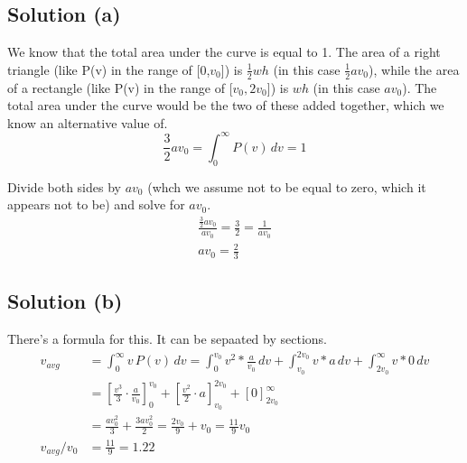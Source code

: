 \documentclass[12pt]{article}
\begin{document}
        \subsection{Solution (a)}
            We know that the total area under the curve is equal to 1.
            The area of a right triangle (like P(v) in the range of [0,$v_0$]) is $\frac{1}{2}wh$ (in this case $\frac{1}{2}av_0$), while the area of a rectangle (like P(v) in the range of [$v_0,2v_0$]) is $wh$ (in this case $av_0$).
            The total area under the curve would be the two of these added together, which we know an alternative value of.
            \begin{equation}
                \frac{3}{2}av_0 =   \int_{0}^{\infty} P(v)\,dv = 1
            \end{equation}

            Divide both sides by $av_0$ (whch we assume not to be equal to zero, which it appears not to be) and solve for $av_0$.
            \begin{gather}
                \frac{\frac{3}{2}av_0}{av_0}    =   \frac{3}{2} =   \frac{1}{av_0}\\
                \boxed{av_0    =   \frac{2}{3}}
            \end{gather}

        \subsection{Solution (b)}
            There's a formula for this.
            It can be sepaated by sections.
            \begin{align}
                v_{avg} &=  \int_{0}^{\infty} v\,P(v)\,dv
                    =   \int_{0}^{v_0} v^2 * \frac{a}{v_0}\,dv + \int_{v_0}^{2v_0} v * a \,dv + \int_{2v_0}^{\infty} v * 0\,dv\\
                    &=  \left[ \frac{v^3}{3} \cdot \frac{a}{v_0} \right]_{0}^{v_0}
                        +   \left[ \frac{v^2}{2} \cdot a \right]_{v_0}^{2v_0}
                        +   \left[ 0 \right]_{2v_0}^{\infty}\\
                    &=  \frac{av_0^2}{3} + \frac{3av_0^2}{2}
                    =   \frac{2v_0}{9} + v_0
                    =   \frac{11}{9}v_0\\
                v_{avg} / v_0   &=  \frac{11}{9}
                    =   \boxed{1.22}
            \end{align}
\end{document}

